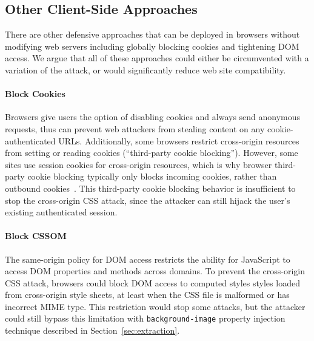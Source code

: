\documentclass{acm_proc_article-sp}
\begin{document}
\subsection{Other Client-Side Approaches}
There are other defensive approaches that can be deployed in browsers without modifying web servers including globally blocking cookies and tightening DOM access.  We argue that all of these approaches could either be circumvented with a variation of the attack, or would significantly reduce web site compatibility.

\paragraph{Block Cookies} 
Browsers give users the option of disabling cookies
and always send anonymous requests, thus can prevent web attackers from
stealing content on any cookie-authenticated URLs. Additionally, some browsers
restrict cross-origin resources from setting or reading cookies (``third-party
cookie blocking''). However, some sites use session cookies for cross-origin
resources, which is why browser third-party cookie blocking typically only
blocks incoming cookies, rather than outbound
cookies~\cite{jackson06thirdpartycookies}. This third-party cookie blocking
behavior is insufficient to stop the cross-origin CSS attack, since the
attacker can still hijack the user's existing authenticated session.

\paragraph{Block CSSOM}
The same-origin policy for DOM access restricts the ability for JavaScript to
access DOM properties and methods across domains. To prevent the cross-origin
CSS attack, browsers could block DOM access to computed styles styles loaded
from cross-origin style sheets, at least when the CSS file is malformed or has
incorrect MIME type. This restriction would stop some attacks, but the
attacker could still bypass this limitation with \texttt{background-image}
property injection technique described in Section~\ref{sec:extraction}.

\end{document}

